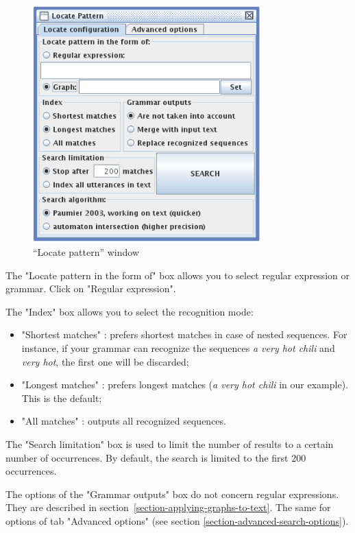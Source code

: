 \bigskip
\begin{figure}[h]
\begin{center}
\includegraphics[width=8.8cm]{resources/img/fig4-4.png}
\caption{``Locate pattern'' window\label{fig-regexp-search-configuration}}
\end{center}
\end{figure}

\noindent The "Locate pattern in the form of" box allows you to select regular
expression or grammar. Click on "Regular expression".

\bigskip
\noindent The "Index" box allows you to select the recognition mode:

\bigskip
{}
\begin{itemize}
  \item "Shortest matches" : prefers shortest matches in case of nested
  sequences. For instance, if your grammar can recognize the sequences \textit{a very hot chili} and 
  \textit{very hot}, the first one will be discarded;
  \item "Longest matches" : prefers longest matches (\textit{a very hot chili}
  in our example). This is the default;
  \item "All matches" : outputs all recognized sequences.
\end{itemize}

\bigskip
\noindent The "Search limitation" box is used to  limit the number of results 
to a certain number of occurrences. By default, the search is limited to the first 200
occurrences.

\bigskip
\noindent The options of the "Grammar outputs" box do not concern regular
expressions. They are described in 
section~\ref{section-applying-graphs-to-text}. The same for options of tab
"Advanced options" (see section \ref{section-advanced-search-options}).

